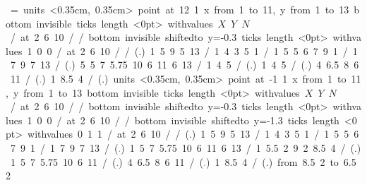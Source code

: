 \let\put\pictexput
\mbox{\beginpicture
\headingtoplotskip=\baselineskip
\setcoordinatesystem units <0.35cm, 0.35cm> point at 12 1
\setplotarea x from 1 to 11, y from 1 to 13
\axis bottom invisible ticks length <0pt>
  withvalues {$X$} {$Y$} {$N$} /  at 2 6 10 / /
\axis bottom invisible shiftedto y=-0.3 ticks length <0pt>
withvalues  {1} {0} {0} /  at 2 6 10 / /
\setplotsymbol ({\normalsize .})
 1 5 9 5 13 /
 1 4 3 5 1 / 
 1 5 5 6 7 9 1 /
 1 7 9 7 13 /
\setplotsymbol ({\textcolor{gray}{\scriptsize .}})
 5 5 7 5.75 10 6 11 6 13 / %
 1 4 5 / %
\setplotsymbol ({\textcolor{blue}{\scriptsize .}})
 1 4 5  / %
\setplotsymbol ({\textcolor{gray}{\scriptsize .}})
 4 6.5 8 6 11 / %
\setplotsymbol ({\textcolor{gray}{\scriptsize .}})
 1 8.5 4 / %
\setplotsymbol ({\normalsize .})
\setcoordinatesystem units <0.35cm, 0.35cm> point at -1 1
\setplotarea x from 1 to 11, y from 1 to 13
\axis bottom invisible ticks length <0pt>
  withvalues {$X$} {$Y$} {$N$} /  at 2 6 10 / /
\axis bottom invisible shiftedto y=-0.3 ticks length <0pt>
withvalues {1} {0} {0} /  at 2 6 10 / /
\axis bottom invisible shiftedto y=-1.3 ticks length <0pt>
withvalues  {0} {1} {1} /  at 2 6 10 / /
\setplotsymbol ({\normalsize .})
 1 5 9 5 13 /
 1 4 3 5 1 / 
 1 5 5 6 7 9 1 /
 1 7 9 7 13 /
\setplotsymbol ({\textcolor{gray}{\scriptsize .}})
 1 5 7 5.75 10 6 11 6 13 / %
 1 5.5 2 9 2  8.5 4 / %
\setplotsymbol ({\textcolor{blue}{\scriptsize .}})
 1 5 7 5.75 10 6 11 / %
\setplotsymbol ({\textcolor{red}{\scriptsize .}})
 4 6.5 8 6 11 /
\setplotsymbol ({\textcolor{gray}{\scriptsize .}})
 1 8.5 4 / %
\setplotsymbol ({\normalsize .})
\arrow <10pt> [.2,.67] from 8.5 2 to 6.5 2
\endpicture}
\let\put\latexput
